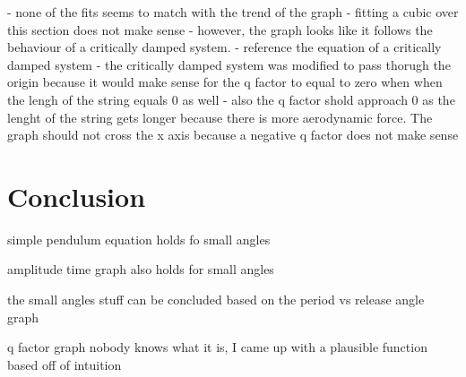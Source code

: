 \documentclass[12pt]{article}
\begin{document}
{- none of the fits seems to match with the trend of the graph
- fitting a cubic over this section does not make sense
- however, the graph looks like it follows the behaviour of a critically damped system.
- reference the equation of a critically damped system
- the critically damped system was modified to pass thorugh the origin because it would make sense for the q factor to equal to zero when when the lengh of the string equals 0 as well
- also the q factor shold approach 0 as the lenght of the string gets longer because there is more aerodynamic force. The graph should not cross the x axis because a negative q factor does not make sense

\section{Conclusion}
simple pendulum equation holds fo small angles

amplitude time graph also holds for small angles

the small angles stuff can be concluded based on the period vs release angle graph

q factor graph nobody knows what it is, I came up with a plausible function based off of intuition

}

\newpage

\printbibliography
\end{document}
